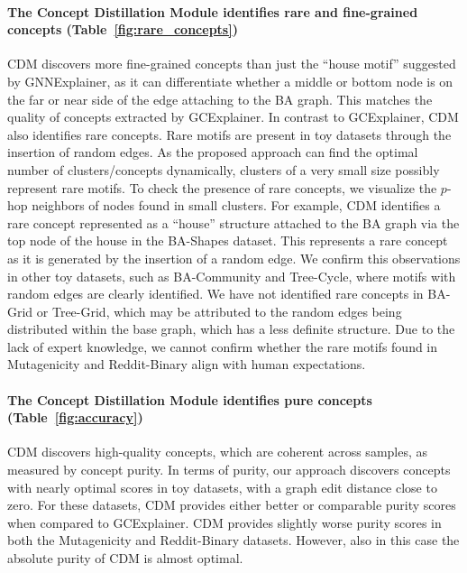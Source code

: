 \documentclass[withindex,glossary]{cam-thesis}
\theoremstyle{plain}
\theoremstyle{definition}
\theoremstyle{remark}
\begin{document}
\paragraph{The Concept Distillation Module identifies rare and fine-grained concepts (Table~\ref{fig:rare_concepts})}
CDM discovers more fine-grained concepts than just the ``house motif'' suggested by GNNExplainer, as it can differentiate whether a middle or bottom node is on the far or near side of the edge attaching to the BA graph. This matches the quality of concepts extracted by GCExplainer. In contrast to GCExplainer, CDM also identifies rare concepts. Rare motifs are present in toy datasets through the insertion of random edges. As the proposed approach can find the optimal number of clusters/concepts dynamically, clusters of a very small size possibly represent rare motifs. To check the presence of rare concepts, we visualize the $p$-hop neighbors of nodes found in small clusters. For example, CDM identifies a rare concept represented as a ``house'' structure attached to the BA graph via the top node of the house in the BA-Shapes dataset. This represents a rare concept as it is generated by the insertion of a random edge. We confirm this observations in other toy datasets, such as BA-Community and Tree-Cycle, where motifs with random edges are clearly identified. We have not identified rare concepts in BA-Grid or Tree-Grid, which may be attributed to the random edges being distributed within the base graph, which has a less definite structure. Due to the lack of expert knowledge, we cannot confirm whether the rare motifs found in Mutagenicity and Reddit-Binary align with human expectations.







\paragraph{The Concept Distillation Module identifies pure concepts (Table~\ref{fig:accuracy})}
CDM discovers high-quality concepts, which are coherent across samples, as measured by concept purity. In terms of purity, our approach discovers concepts with nearly optimal scores in toy datasets, with a graph edit distance close to zero. For these datasets, CDM provides either better or comparable purity scores when compared to GCExplainer. CDM provides slightly worse purity scores in both the Mutagenicity and Reddit-Binary datasets. However, also in this case the absolute purity of CDM is almost optimal.
\end{document}

